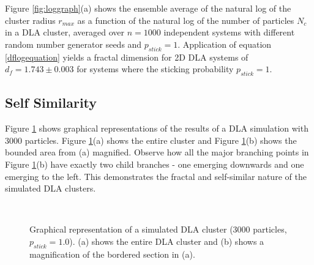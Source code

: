 \documentclass[11pt]{iopart}
\begin{document}
Figure \ref{fig:loggraph}(a) shows the ensemble average of the natural log of the cluster radius $r_{max}$ as a function of the natural log of the number of particles $N_c$ in a DLA cluster, averaged over $n=1000$ independent systems with different random number generator seeds and $p_{stick} = 1$. Application of equation \ref{dflogequation} yields a fractal dimension for 2D DLA systems of $d_f = 1.743 \pm 0.003$ for systems where the sticking probability $p_{stick} = 1$.

\subsection{Self Similarity}

Figure \ref{fig:selfsimilar} shows graphical representations of the results of a DLA simulation with 3000 particles. Figure \ref{fig:selfsimilar}(a) shows the entire cluster and Figure \ref{fig:selfsimilar}(b) shows the bounded area from (a) magnified. Observe how all the major branching points in Figure \ref{fig:selfsimilar}(b) have exactly two child branches - one emerging downwards and one emerging to the left. This demonstrates the fractal and self-similar nature of the simulated DLA clusters.

\begin{figure}[t]
    \centering
    \quad
     \\
 
    \caption{Graphical representation of a simulated DLA cluster (3000 particles, $p_{stick} = 1.0$). (a) shows the entire DLA cluster and (b) shows a magnification of the bordered section in (a).}
    \label{fig:selfsimilar}
\end{figure}
\end{document}
